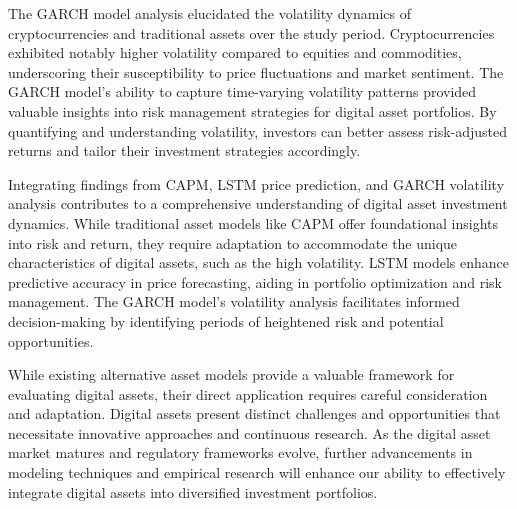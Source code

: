 The GARCH model analysis elucidated the volatility dynamics of cryptocurrencies and traditional assets over the study period. Cryptocurrencies exhibited notably higher volatility compared to equities and commodities, underscoring their susceptibility to price fluctuations and market sentiment. The GARCH model's ability to capture time-varying volatility patterns provided valuable insights into risk management strategies for digital asset portfolios. By quantifying and understanding volatility, investors can better assess risk-adjusted returns and tailor their investment strategies accordingly.

Integrating findings from CAPM, LSTM price prediction, and GARCH volatility analysis contributes to a comprehensive understanding of digital asset investment dynamics. While traditional asset models like CAPM offer foundational insights into risk and return, they require adaptation to accommodate the unique characteristics of digital assets, such as the high volatility. LSTM models enhance predictive accuracy in price forecasting, aiding in portfolio optimization and risk management. The GARCH model's volatility analysis facilitates informed decision-making by identifying periods of heightened risk and potential opportunities.

While existing alternative asset models provide a valuable framework for evaluating digital assets, their direct application requires careful consideration and adaptation. Digital assets present distinct challenges and opportunities that necessitate innovative approaches and continuous research. As the digital asset market matures and regulatory frameworks evolve, further advancements in modeling techniques and empirical research will enhance our ability to effectively integrate digital assets into diversified investment portfolios.






